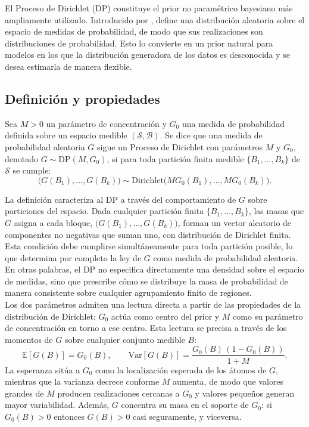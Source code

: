 El Proceso de Dirichlet (DP) constituye el prior no paramétrico bayesiano más ampliamente utilizado. Introducido por \cite{02_04_ferguson1973bayesian}, define una distribución aleatoria sobre el espacio de medidas de probabilidad, de modo que sus realizaciones son distribuciones de probabilidad. Esto lo convierte en un prior natural para modelos en los que la distribución generadora de los datos es desconocida y se desea estimarla de manera flexible.

\subsection{Definición y propiedades}
\label{02_04_01_propiedades_dp}
\begin{definition}
Sea $M > 0$ un parámetro de concentración y $G_0$ una medida de probabilidad definida sobre un espacio medible $(\mathcal{S}, \mathcal{B})$. Se dice que una medida de probabilidad aleatoria $G$ sigue un Proceso de Dirichlet con parámetros $M$ y $G_0$, denotado $G \sim \mathrm{DP}(M, G_0)$, si para toda partición finita medible $\{B_1, \dots, B_k\}$ de $\mathcal{S}$ se cumple:
\begin{equation}
    \bigl(G(B_1), \dots, G(B_k)\bigr)
    \sim \mathrm{Dirichlet}\bigl(M G_0(B_1), \dots, M G_0(B_k)\bigr).
\end{equation}
\end{definition}

La definición caracteriza al DP a través del comportamiento de $G$ sobre particiones del espacio. Dada cualquier partición finita $\{B_1, \dots, B_k\}$, las masas que $G$ asigna a cada bloque, $\bigl(G(B_1), \dots, G(B_k)\bigr)$, forman un vector aleatorio de componentes no negativas que suman uno, con distribución de Dirichlet finita. Esta condición debe cumplirse simultáneamente para toda partición posible, lo que determina por completo la ley de $G$ como medida de probabilidad aleatoria. En otras palabras, el DP no especifica directamente una densidad sobre el espacio de medidas, sino que prescribe cómo se distribuye la masa de probabilidad de manera consistente sobre cualquier agrupamiento finito de regiones.\\

Los dos parámetros admiten una lectura directa a partir de las propiedades de la distribución de Dirichlet: $G_0$ actúa como centro del prior y $M$ como su parámetro de concentración en torno a ese centro. Esta lectura se precisa a través de los momentos de $G$ sobre cualquier conjunto medible $B$:
\begin{equation}
    \mathbb{E}[G(B)] = G_0(B), \qquad
    \mathrm{Var}[G(B)] = \frac{G_0(B)\,(1 - G_0(B))}{1 + M}.
\end{equation}
La esperanza sitúa a $G_0$ como la localización esperada de los átomos de $G$, mientras que la varianza decrece conforme $M$ aumenta, de modo que valores grandes de $M$ producen realizaciones cercanas a $G_0$ y valores pequeños generan mayor variabilidad. Además, $G$ concentra su masa en el soporte de $G_0$: si $G_0(B) > 0$ entonces $G(B) > 0$ casi seguramente, y viceversa.\\

